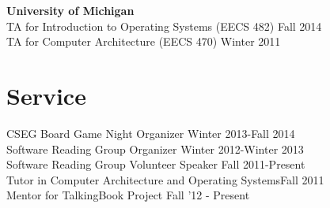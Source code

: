 \documentclass[margin, 10pt]{res} %
\begin{document}
\begin{resume}
\textbf{University of Michigan} \\
TA for Introduction to Operating Systems (EECS 482) \hfill Fall 2014 \\
TA for Computer Architecture (EECS 470) \hfill Winter 2011 \\

%
%
%

\section{Service}
CSEG Board Game Night Organizer \hfill Winter 2013-Fall 2014 \\
Software Reading Group Organizer \hfill Winter 2012-Winter 2013 \\
Software Reading Group Volunteer Speaker \hfill Fall 2011-Present \\
Tutor in Computer Architecture and Operating Systems\hfill Fall 2011 \\
Mentor for TalkingBook Project \hfill Fall '12 - Present \\

\end{resume}
\end{document}
